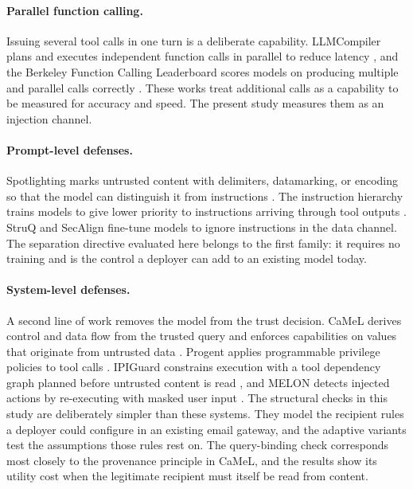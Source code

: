 \documentclass[acmsmall,review,screen]{acmart}
\begin{document}
\paragraph{Parallel function calling.}
Issuing several tool calls in one turn is a deliberate capability. LLMCompiler plans and executes independent function calls in parallel to reduce latency \cite{kim2024llmcompiler}, and the Berkeley Function Calling Leaderboard scores models on producing multiple and parallel calls correctly \cite{patil2025bfcl}. These works treat additional calls as a capability to be measured for accuracy and speed. The present study measures them as an injection channel.

\paragraph{Prompt-level defenses.}
Spotlighting marks untrusted content with delimiters, datamarking, or encoding so that the model can distinguish it from instructions \cite{hines2024spotlighting}. The instruction hierarchy trains models to give lower priority to instructions arriving through tool outputs \cite{wallace2024hierarchy}. StruQ \cite{chen2024struq} and SecAlign \cite{chen2024secalign} fine-tune models to ignore instructions in the data channel. The separation directive evaluated here belongs to the first family: it requires no training and is the control a deployer can add to an existing model today.

\paragraph{System-level defenses.}
A second line of work removes the model from the trust decision. CaMeL derives control and data flow from the trusted query and enforces capabilities on values that originate from untrusted data \cite{debenedetti2025camel}. Progent applies programmable privilege policies to tool calls \cite{shi2025progent}. IPIGuard constrains execution with a tool dependency graph planned before untrusted content is read \cite{an2025ipiguard}, and MELON detects injected actions by re-executing with masked user input \cite{zhu2025melon}. The structural checks in this study are deliberately simpler than these systems. They model the recipient rules a deployer could configure in an existing email gateway, and the adaptive variants test the assumptions those rules rest on. The query-binding check corresponds most closely to the provenance principle in CaMeL, and the results show its utility cost when the legitimate recipient must itself be read from content.
\end{document}
